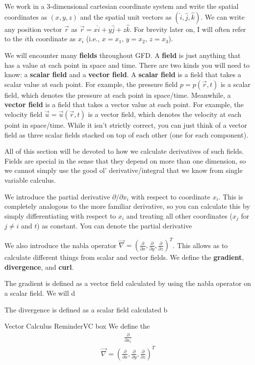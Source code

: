 We work in a 3-dimensional cartesian coordinate system and write the spatial coordinates as $(x,y,z)$ and the spatial unit vectors as $(\hat{i},\hat{j},\hat{k})$. We can write any position vector $\vec{r}$ as $\vec{r}=x\hat{i}+y\hat{j}+z\hat{k}$. For brevity later on, I will often refer to the $i$th coordinate as $x_i$ (i.e., $x=x_1$, $y=x_2$, $z=x_3$).

We will encounter many \textbf{fields} throughout GFD. A \textbf{field} is just anything that has a value at each point in space and time. There are two kinds you will need to know: a \textbf{scalar field} and a \textbf{vector field}. A \textbf{scalar field} is a field that takes a scalar value at each point. For example, the pressure field $p=p(\vec{r},t)$ is a scalar field, which denotes the pressure at each point in space/time. Meanwhile, a \textbf{vector field} is a field that takes a vector value at each point. For example, the velocity field $\vec{u}=\vec{u}(\vec{r},t)$ is a vector field, which denotes the velocity at each point in space/time. While it isn't strictly correct, you can just think of a vector field as three scalar fields stacked on top of each other (one for each component).

All of this section will be devoted to how we calculate derivatives of such fields. Fields are special in the sense that they depend on more than one dimension, so we cannot simply use the good ol' derivative/integral that we know from single variable calculus.

We introduce the partial derivative $\partial/\partial x_i$ with respect to coordinate $x_i$. This is completely analogous to the more familiar derivative, so you can calculate this by simply differentiating with respect to $x_i$ and treating all other coordinates ($x_j$ for $j\neq i$ and $t$) as constant. You can denote the partial derivative 

We also introduce the nabla operator $\vec{\nabla}=\left( \frac{\partial}{\partial x}, \frac{\partial}{\partial y}, \frac{\partial}{\partial z} \right)^T$. This allows as to calculate different things from scalar and vector fields. We define the \textbf{gradient}, \textbf{divergence}, and \textbf{curl}.

The gradient is defined as a vector field calculated by using the nabla operator on a scalar field. We will d

The divergence is defined as a scalar field calculated b

\begin{fact}{Vector Calculus Reminder}{VC box}\label{VC box}
    We define the 
    \begin{align*}
        \frac{\partial}{\partial x_i}
    \end{align*}
    \begin{align*}
        \vec{\nabla}=\left( \frac{\partial}{\partial x}, \frac{\partial}{\partial y}, \frac{\partial}{\partial z} \right)^T
    \end{align*}
\end{fact}



